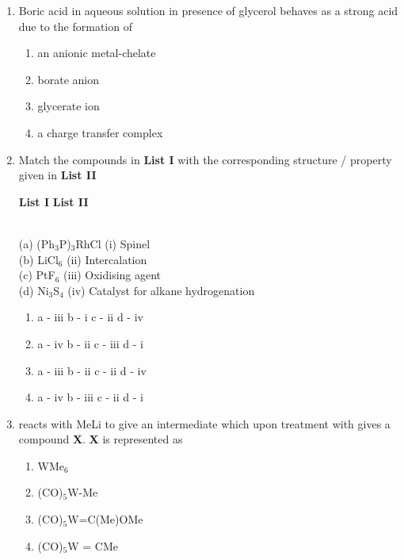 \documentclass[journal,12pt,onecolumn]{IEEEtran}
\theoremstyle{remark}
\begin{document}
\begin{enumerate}
\item Boric acid in aqueous solution in presence of glycerol behaves as a strong acid due to the formation of \hfill{}
\begin{multicols}{2}
\begin{enumerate}[leftmargin=*,labelsep=1em]
     \item   an anionic metal-chelate
     \item   borate anion
     \item   glycerate ion
     \item   a charge transfer complex
\end{enumerate}
\end{multicols}
  

\item Match the compounds in \textbf{List I} with the corresponding structure / property given in \textbf{List II} \hfill{}

\begin{tabbing}
\hspace{3cm} \= \textbf{List I} \hspace{5cm} \= \textbf{List II} 

\\
(a) (Ph$_3$P)$_3$RhCl \> (i) Spinel \\
(b) LiCl$_6$ \> (ii) Intercalation \\
(c) PtF$_6$ \> (iii) Oxidising agent \\
(d) Ni$_3$S$_4$ \> (iv) Catalyst for alkane hydrogenation \\

\end{tabbing}


\begin{enumerate}[leftmargin=*,labelsep=1em]
     \item   a - iii \quad b - i \quad c - ii \quad d - iv
     \item   a - iv \quad b - ii \quad c - iii \quad d - i
     \item   a - iii \quad b - ii \quad c - ii \quad d - iv
     \item   a - iv \quad b - iii \quad c - ii \quad d - i
\end{enumerate}

  

\item {} reacts with MeLi to give an intermediate which upon treatment with  gives a compound \textbf{X}. \textbf{X} is represented as \hfill{}
\begin{multicols}{2}
\begin{enumerate}[leftmargin=*,labelsep=1em]
     \item   WMe$_6$
     \item   (CO)$_5$W-Me
     \item   (CO)$_5$W=C(Me)OMe
     \item   (CO)$_5$W = CMe
\end{enumerate}
\end{multicols}
  


\end{enumerate}
\end{document}
